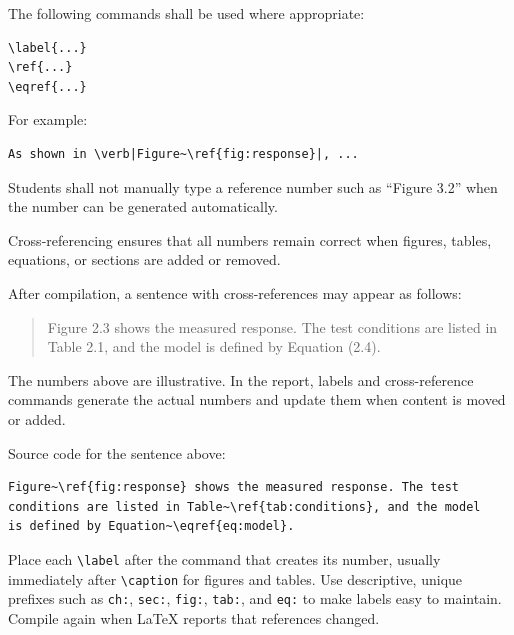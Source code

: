 {The following commands shall be used where appropriate:

\begin{verbatim}
\label{...}
\ref{...}
\eqref{...}
\end{verbatim}

For example:

\begin{verbatim}
As shown in \verb|Figure~\ref{fig:response}|, ...
\end{verbatim}

Students shall not manually type a reference number such as
``Figure 3.2'' when the number can be generated automatically.

Cross-referencing ensures that all numbers remain correct when
figures, tables, equations, or sections are added or removed.


After compilation, a sentence with cross-references may appear as
follows:

\begin{quote}
Figure 2.3 shows the measured response. The test conditions are
listed in Table 2.1, and the model is defined by Equation (2.4).
\end{quote}

The numbers above are illustrative. In the report, labels and
cross-reference commands generate the actual numbers and update them
when content is moved or added.

Source code for the sentence above:

\begin{verbatim}
Figure~\ref{fig:response} shows the measured response. The test
conditions are listed in Table~\ref{tab:conditions}, and the model
is defined by Equation~\eqref{eq:model}.
\end{verbatim}

Place each \verb|\label| after the command that creates its number,
usually immediately after \verb|\caption| for figures and tables.
Use descriptive, unique prefixes such as \verb|ch:|, \verb|sec:|,
\verb|fig:|, \verb|tab:|, and \verb|eq:| to make labels easy to
maintain. Compile again when LaTeX reports that references changed.

\vspace{0.3cm}


}
